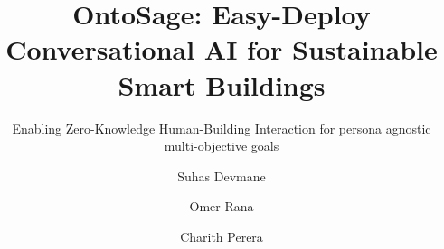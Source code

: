 \documentclass[acmlarge]{acmart}
\begin{document}
\title[OntoSage: Easy-Deploy Conversational AI for Sustainable Smart Buildings]{OntoSage: Easy-Deploy Conversational AI for Sustainable Smart Buildings}
\subtitle{Enabling Zero-Knowledge Human-Building Interaction for persona agnostic multi-objective goals}

\author{Suhas Devmane}
\authornotemark[1]

\author{Omer Rana}

\author{Charith Perera}

\renewcommand{\shortauthors}{Trovato et al.}
\end{document}
